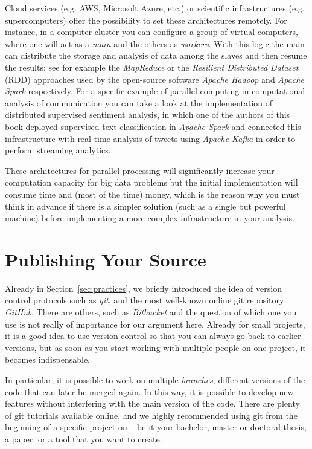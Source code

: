 Cloud services (e.g. AWS, Microsoft Azure, etc.) or scientific infrastructures (e.g. supercomputers) offer the possibility to set these architectures remotely. For instance, in a computer cluster you can configure a group of virtual computers, where one will act as a \textit{main} and the others as \textit{workers}. With this logic the main can distribute the storage and analysis of data among the slaves and then resume the results: see for example the \textit{MapReduce} or the \textit{Resilient Distributed Dataset} (RDD) approaches used by the open-source software \textit{Apache Hadoop} and \textit{Apache Spark} respectively.  For a specific example of parallel computing in computational analysis of communication you can take a look at the implementation of distributed supervised sentiment analysis,  in which one of the authors of this book deployed supervised text classification in \textit{Apache Spark}  and connected this infrastructure with real-time analysis of tweets using \textit{Apache Kafka}  in order to perform streaming analytics\cite[see][]{calderon2019distributed}.

These architectures for parallel processing will significantly increase your computation capacity for big data problems but the initial implementation will consume time and (most of the time) money, which is the reason why you must think in advance if there is a simpler solution (such as a single but powerful machine) before implementing a more complex infrastructure in your analysis.

%

\section{Publishing Your Source}
\label{sec:publishingsource}

Already in Section~\ref{sec:practices}, we briefly introduced the idea of
version control protocols such as \emph{git}, and the most well-known
online git repository \emph{GitHub}.
There are others, such as \emph{Bitbucket}
and the question of which one you use is not really of importance for our
argument here. Already for small projects, it is a good idea to use
version control so that you can always go back to earlier versions,
but as soon as you start working with multiple people on one project,
it becomes indispensable.

In particular, it is possible to work on multiple \emph{branches},
different versions of the code that can later be merged again. In this
way, it is possible to develop new features without interfering with
the main version of the code. There are plenty of git tutorials
available online, and we highly recommended using git from the
beginning of a specific project on -- be it your bachelor, master or doctoral thesis, a paper, or a tool that you want to create.

